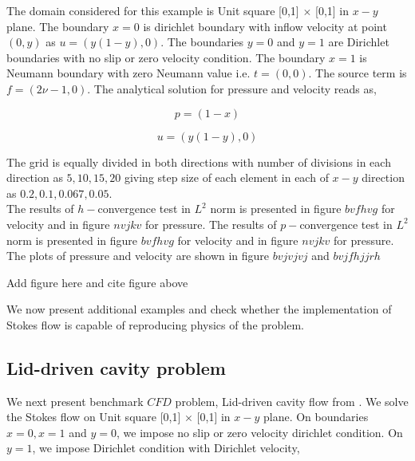 \documentclass[a4paper,12pt]{book}
\begin{document}
The domain considered for this example is Unit square [0,1] $\times$ [0,1] in $x-y$ plane. 
The boundary ${x=0}$ is dirichlet boundary with inflow velocity at point $(0,y)$ as $u = (y(1-y), 0)$. The boundaries ${y = 0}$ and ${y = 1}$ are Dirichlet boundaries with no slip or zero velocity condition. The boundary ${x = 1}$ is Neumann boundary with zero Neumann value i.e. $t = (0, 0)$. The source term is $f = (2 \nu - 1, 0)$. The analytical solution for pressure and velocity reads as,

\begin{center}

\begin{equation}
p = (1 - x)
\end{equation}

\begin{equation} 
 u = (y(1-y), 0)
\end{equation}

\end{center}

The grid is equally divided in both directions with number of divisions in each direction as $5,10,15,20$ giving step size of each element in each of $x-y$ direction as $0.2,0.1,0.067,0.05$.\\

The results of $h-$convergence test in $L^2$ norm is presented in figure $bvfhvg$ for velocity and in figure $nvjkv$ for pressure. The results of $p-$convergence test in $L^2$ norm is presented in figure $bvfhvg$ for velocity and in figure $nvjkv$ for pressure. The plots of pressure and velocity are shown in figure $bvjvjvj$ and $bvjfhjjrh$

\begin{Huge}
Add figure here and cite figure above
\end{Huge}

We now present additional examples and check whether the implementation of Stokes flow is capable of reproducing physics of the problem.

\subsection{Lid-driven cavity problem}

We next present benchmark $CFD$ problem, Lid-driven cavity flow from \cite{Montlaur}. We solve the Stokes flow on Unit square [0,1] $\times$ [0,1] in $x-y$ plane. On boundaries ${x = 0}, {x = 1}$ and ${y = 0}$, we impose no slip or zero velocity dirichlet condition. On ${y = 1}$, we impose Dirichlet condition with Dirichlet velocity,
\end{document}
